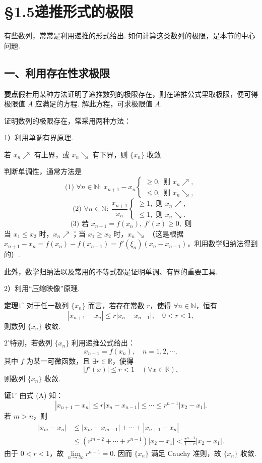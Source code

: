 \documentclass[UTF8,12pt,a4paper,fontset=fandol]{ctexart}
\begin{document}
\section*{§1.5\quad 递推形式的极限}

有些数列，常常是利用递推的形式给出. 如何计算这类数列的极限，是本节的中心问题.

\subsection*{一、利用存在性求极限}

\noindent\textbf{要点}\quad 假若用某种方法证明了递推数列的极限存在，则在递推公式里取极限，便可得极限值 $A$ 应满足的方程. 解此方程，可求极限值 $A$.

证明数列的极限存在，常采用两种方法：

1）利用单调有界原理.

若 $x_n\nearrow$ 有上界，或 $x_n\searrow$ 有下界，则 $\{x_n\}$ 收敛.

判断单调性，通常方法是
\[
  \text{(1) }\forall n\in\mathbb N:\ x_{n+1}-x_n
  \begin{cases}
    \ge0,\text{ 则 }x_n\nearrow,\\
    \le0,\text{ 则 }x_n\searrow,
  \end{cases}
\]
\[
  \text{(2) }\forall n\in\mathbb N:\ \frac{x_{n+1}}{x_n}
  \begin{cases}
    \ge1,\text{ 则 }x_n\nearrow,\\
    \le1,\text{ 则 }x_n\searrow.
  \end{cases}
\]
\[
  \text{(3) 若 }x_{n+1}=f(x_n),\ f'(x)\ge0,\text{ 则}
\]
当 $x_1\le x_2$ 时，$x_n\nearrow$；当 $x_1\ge x_2$ 时，$x_n\searrow$
（这是根据 $x_{n+1}-x_n=f(x_n)-f(x_{n-1})=f'(\xi_n)(x_n-x_{n-1})$，利用数学归纳法得到的）.

此外，数学归纳法以及常用的不等式都是证明单调、有界的重要工具.

2）利用“压缩映像”原理.

\noindent\textbf{定理}\quad $1^\circ$ 对于任一数列 $\{x_n\}$ 而言，若存在常数 $r$，使得 $\forall n\in\mathbb N$，恒有
\[
  |x_{n+1}-x_n|\le r|x_n-x_{n-1}|,\quad 0<r<1, \tag{A}
\]
则数列 $\{x_n\}$ 收敛.

$2^\circ$\quad 特别，若数列 $\{x_n\}$ 利用递推公式给出：
\[
  x_{n+1}=f(x_n), \quad n=1,2,\cdots,
\]
其中 $f$ 为某一可微函数，且 $\exists r\in\mathbb R$，使得
\[
  |f'(x)|\le r<1\quad (\forall x\in\mathbb R), \tag{B}
\]
则数列 $\{x_n\}$ 收敛.

\noindent\textbf{证}\quad $1^\circ$ 由式 (A) 知：
\[
  |x_{n+1}-x_n|\le r|x_n-x_{n-1}|\le \cdots\le r^{n-1}|x_2-x_1|.
\]
若 $m>n$，则
\[
\begin{aligned}
  |x_m-x_n|
  &\le |x_m-x_{m-1}|+\cdots+|x_{n+1}-x_n|\\
  &\le (r^{m-2}+\cdots+r^{n-1})|x_2-x_1|
  < \frac{r^{n-1}}{1-r}|x_2-x_1|.
\end{aligned}
\]
由于 $0<r<1$，故 $\lim\limits_{n\to\infty}r^{n-1}=0$. 因而 $\{x_n\}$ 满足 Cauchy 准则，故 $\{x_n\}$ 收敛.
\end{document}
